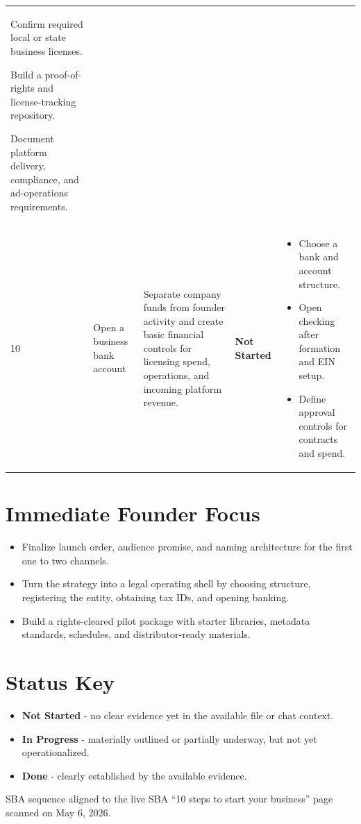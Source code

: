 \documentclass[10pt]{article}
\newcommand{\statusbox}[1]{\textbf{#1}}
\newcommand{\tightlist}[1]{\begin{itemize}#1\end{itemize}}
\begin{document}
\begin{longtable}{@{}L{0.05\textwidth}L{0.16\textwidth}L{0.28\textwidth}L{0.10\textwidth}L{0.25\textwidth}@{}}
{\item Confirm required local or state business licenses.
\item Build a proof-of-rights and license-tracking repository.
\item Document platform delivery, compliance, and ad-operations requirements.
} \\
10 & Open a business bank account & Separate company funds from founder activity and create basic financial controls for licensing spend, operations, and incoming platform revenue. & \statusbox{Not Started} & \tightlist{
\item Choose a bank and account structure.
\item Open checking after formation and EIN setup.
\item Define approval controls for contracts and spend.
} \\
\end{longtable}

\normalsize
\section*{Immediate Founder Focus}
\begin{itemize}
    \item Finalize launch order, audience promise, and naming architecture for the first one to two channels.
    \item Turn the strategy into a legal operating shell by choosing structure, registering the entity, obtaining tax IDs, and opening banking.
    \item Build a rights-cleared pilot package with starter libraries, metadata standards, schedules, and distributor-ready materials.
\end{itemize}

\section*{Status Key}
\begin{itemize}
    \item \textbf{Not Started} - no clear evidence yet in the available file or chat context.
    \item \textbf{In Progress} - materially outlined or partially underway, but not yet operationalized.
    \item \textbf{Done} - clearly established by the available evidence.
\end{itemize}

\vfill
{\footnotesize SBA sequence aligned to the live SBA ``10 steps to start your business'' page scanned on May 6, 2026.}
\end{document}
